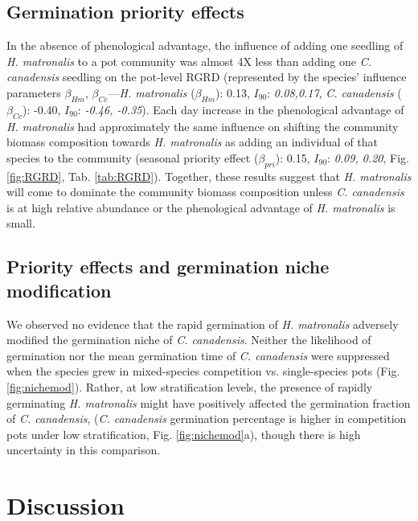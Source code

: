 \documentclass{article}[11pt]
\begin{document}
\subsection*{Germination priority effects}
In the absence of phenological advantage, the influence  of adding one seedling of \textit{H. matronalis} to a pot community was almost 4X less than adding one \textit{C. canadensis} seedling on the pot-level RGRD (represented by the species' influence parameters $\beta_{Hm}$, $\beta_{Cc}$---\textit{H. matronalis} ($\beta_{Hm}$): 0.13, $I_{90}$: \textit{0.08,0.17}, \textit{C. canadensis} ($\beta_{Cc}$): -0.40, $I_{90}$: \textit{-0.46, -0.35}). Each day increase in the phenological advantage of \textit{ H. matronalis} had approximately the same influence on shifting the community biomass composition towards \textit{H. matronalis} as adding an individual of that species to the community (seasonal priority effect ($\beta_{pri}$): 0.15, $I_{90}$: \textit{0.09, 0.20}, Fig. \ref{fig:RGRD}, Tab. \ref{tab:RGRD}). Together, these results suggest that \textit{H. matronalis} will come to dominate the community biomass composition unless \textit{C. canadensis} is at high relative abundance or the phenological advantage of \textit{H. matronalis} is small. %

\subsection*{Priority effects and germination niche modification}
We observed no evidence that the rapid germination of \textit{H. matronalis} adversely modified the germination niche of \textit{C. canadensis}. Neither the likelihood of germination nor the mean germination time of \textit{C. canadensis} were suppressed when the species grew in mixed-species competition vs. single-species pots (Fig. \ref{fig:nichemod}). Rather, at low stratification levels, the presence of rapidly germinating \textit{H. matronalis} might have positively affected the germination fraction of \textit{C. canadensis}, (\textit{C. canadensis} germination percentage is higher in competition pots under low stratification, Fig. \ref{fig:nichemod}a), though there is high uncertainty in this comparison.

\section*{Discussion}
\end{document}
